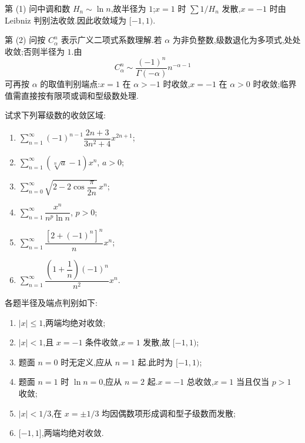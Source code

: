 \begin{solution}
    第 (1) 问中调和数 $H_n\sim\ln n$,故半径为 $1$;$x=1$ 时
    $\displaystyle\sum1/H_n$ 发散,$x=-1$ 时由 Leibniz 判别法收敛.因此收敛域为 $\lbrack-1,1)$.

    第 (2) 问按 $C_{\alpha}^{n}$ 表示广义二项式系数理解.若 $\alpha$ 为非负整数,级数退化为多项式,处处收敛;否则半径为 $1$.由
    \[
        C_{\alpha}^{n}\sim\dfrac{(-1)^n}{\Gamma(-\alpha)}n^{-\alpha-1}
    \]
    可再按 $\alpha$ 的取值判别端点:$x=1$ 在 $\alpha>-1$ 时收敛,$x=-1$ 在 $\alpha>0$ 时收敛;临界值需直接按有限项或调和型级数处理.
\end{solution}

\begin{example}
    试求下列幂级数的收敛区域:
    \begin{enumerate}
        \item $\displaystyle\sum\limits_{n=1}^{\infty}(-1)^{n-1}\dfrac{2n+3}{3n^2+4}x^{2n+1}$;
        \item $\displaystyle\sum\limits_{n=1}^{\infty}(\sqrt[n]{a}-1)x^n$, $a>0$;
        \item $\displaystyle\sum\limits_{n=0}^{\infty}\sqrt{2-2\cos\dfrac{\pi}{2n}}\,x^n$;
        \item $\displaystyle\sum\limits_{n=1}^{\infty}\dfrac{x^n}{n^p\ln n}$, $p>0$;
        \item $\displaystyle\sum\limits_{n=1}^{\infty}\dfrac{[2+(-1)^n]^n}{n}x^n$;
        \item $\displaystyle\sum\limits_{n=1}^{\infty}\dfrac{(1+\dfrac{1}{n})(-1)^n}{n^2}x^n$.
    \end{enumerate}
\end{example}
\exampleblank

\begin{solution}
    各题半径及端点判别如下:
    \begin{enumerate}
        \item $|x|\leq1$,两端均绝对收敛;
        \item $|x|<1$,且 $x=-1$ 条件收敛,$x=1$ 发散,故 $\lbrack-1,1)$;
        \item 题面 $n=0$ 时无定义,应从 $n=1$ 起.此时为 $\lbrack-1,1)$;
        \item 题面 $n=1$ 时 $\ln n=0$,应从 $n=2$ 起.$x=-1$ 总收敛,$x=1$ 当且仅当 $p>1$ 收敛;
        \item $|x|<1/3$,在 $x=\pm1/3$ 均因偶数项形成调和型子级数而发散;
        \item $\lbrack-1,1\rbrack$,两端均绝对收敛.
    \end{enumerate}
\end{solution}

